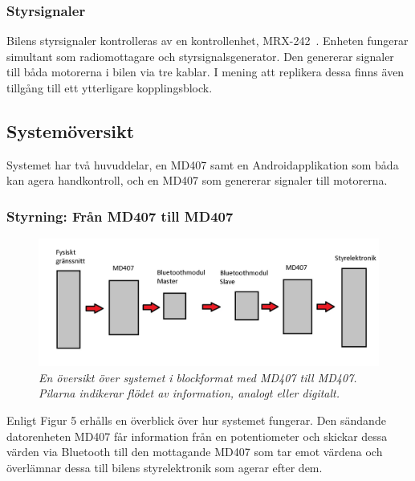 \documentclass[a4paper]{article}
\begin{document}
\subsubsection{Styrsignaler}
Bilens styrsignaler kontrolleras av en kontrollenhet, MRX-242~\cite{projektDir}. Enheten fungerar simultant som radiomottagare och styrsignalsgenerator. Den genererar signaler till båda motorerna i bilen via tre kablar. I mening att replikera dessa finns även tillgång till ett ytterligare kopplingsblock.


\subsection{Systemöversikt}
Systemet har två huvuddelar, en MD407 samt en Androidapplikation som båda kan agera handkontroll, och en MD407 som genererar signaler till motorerna.

\subsubsection{Styrning: Från MD407 till MD407}
\begin{figure}[H]
\includegraphics[width=\textwidth]{systemoversikt.jpg}
\centering
\caption{\it En översikt över systemet i blockformat med MD407 till MD407. Pilarna indikerar flödet av information, analogt eller digitalt.}
\end{figure} 


Enligt Figur 5 erhålls en överblick över hur systemet fungerar. Den sändande datorenheten MD407 får information från en potentiometer och skickar dessa värden via Bluetooth till den mottagande MD407 som tar emot värdena och överlämnar dessa till bilens styrelektronik som agerar efter dem.
\end{document}
